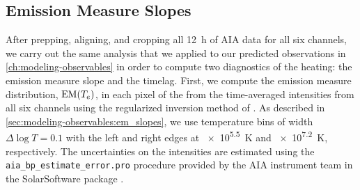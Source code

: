 \subsection{Emission Measure Slopes}\label{sec:classifying-observables:em_slopes}

After prepping, aligning, and cropping all \SI{12}{\hour} of AIA data for all six channels, we carry out the same analysis that we applied to our predicted observations in \autoref{ch:modeling-observables} in order to compute two diagnostics of the heating: the emission measure slope and the timelag. First, we compute the emission measure distribution, $\textup{EM}(T_e)$, in each pixel of the \AR{} from the time-averaged intensities from all six channels using the regularized inversion method of \citet{hannah_differential_2012}. As described in \autoref{sec:modeling-observables:em_slopes}, we use temperature bins of width $\Delta\log T=0.1$ with the left and right edges at \SI{e5.5}{\kelvin}  and \SI{e7.2}{\kelvin}, respectively. The uncertainties on the intensities are estimated using the \texttt{aia\_bp\_estimate\_error.pro} procedure provided by the AIA instrument team in the SolarSoftware package \citep[SSW,][]{freeland_data_1998}.



